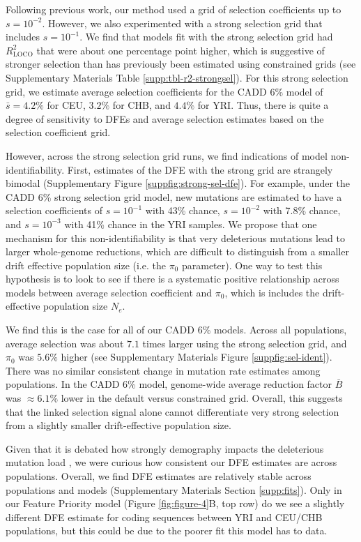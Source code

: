 \documentclass[11pt]{article}
\begin{document}
Following previous work, our method used a grid of selection coefficients up to
$s=10^{-2}$. However, we also experimented with a strong selection grid that
includes $s=10^{-1}$. We find that models fit with the strong selection grid
had $R_\text{LOCO}^2$ that were about one percentage point higher, which is
suggestive of stronger selection than has previously been estimated using
constrained grids (see Supplementary Materials Table
\ref{supp:tbl-r2-strongsel}). For this strong selection grid, we estimate
average selection coefficients for the CADD 6\% model of $\bar{s} = 4.2\%$ for
CEU, $3.2\%$ for CHB, and $4.4\%$ for YRI. Thus, there is quite a degree of
sensitivity to DFEs and average selection estimates based on the selection
coefficient grid.

However, across the strong selection grid runs, we find indications of model
non-identifiability. First, estimates of the DFE with the strong grid are
strangely bimodal (Supplementary Figure \ref{suppfig:strong-sel-dfe}). For
example, under the CADD 6\% strong selection grid model, new mutations are
estimated to have a selection coefficients of $s = 10^{-1}$ with 43\% chance,
$s=10^{-2}$ with 7.8\% chance, and $s=10^{-3}$ with 41\% chance in the YRI
samples. We propose that one mechanism for this non-identifiability is that
very deleterious mutations lead to larger whole-genome reductions, which are
difficult to distinguish from a smaller drift effective population size (i.e.
the $\pi_0$ parameter). One way to test this hypothesis is to look to see if
there is a systematic positive relationship across models between average
selection coefficient and $\pi_0$, which is includes the drift-effective
population size $N_e$.

We find this is the case for all of our CADD 6\% models. Across all
populations, average selection was about $7.1$ times larger using the strong
selection grid, and $\pi_0$ was $5.6\%$ higher (see Supplementary Materials
Figure \ref{suppfig:sel-ident}). There was no similar consistent change in
mutation rate estimates among populations. In the CADD 6\% model, genome-wide
average reduction factor $\bar{B}$ was $\approx 6.1\%$ lower in the default
versus constrained grid. Overall, this suggests that the linked selection
signal alone cannot differentiate very strong selection from a slightly smaller
drift-effective population size. 

Given that it is debated how strongly demography impacts the deleterious
mutation load
\parencite{Torres2018-ni,Torres2020-hc,Lohmueller2008-qi,Simons2014-sv,Simons2016-cs},
we were curious how consistent our DFE estimates are across populations.
Overall, we find DFE estimates are relatively stable across populations and
models (Supplementary Materials Section \ref{supp:fits}). Only in our Feature
Priority model (Figure \ref{fig:figure-4}B, top row) do we see a slightly
different DFE estimate for coding sequences between YRI and CEU/CHB
populations, but this could be due to the poorer fit this model has to data.
\end{document}

